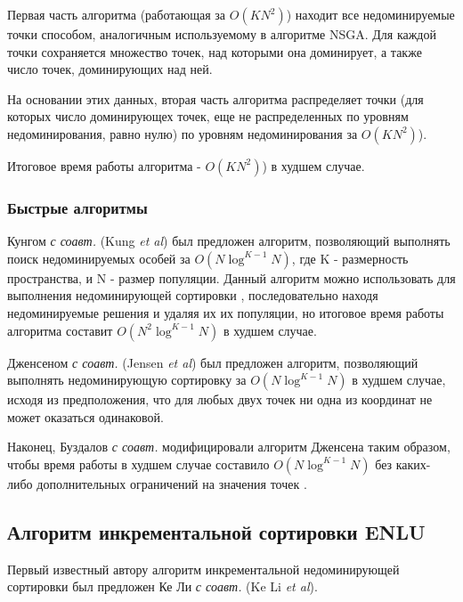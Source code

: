 Первая часть алгоритма (работающая за $O(KN^2)$) находит все недоминируемые точки способом,
аналогичным используемому в алгоритме NSGA. Для каждой точки сохраняется множество точек,
над которыми она доминирует, а также число точек, доминирующих над ней.

На основании этих данных, вторая часть алгоритма распределяет точки (для которых число
доминирующех точек, еще не распределенных по уровням недоминирования, равно нулю) по уровням
недоминирования за $O(KN^2)$).

Итоговое время работы алгоритма - $O(KN^2)$) в худшем случае.

\subsubsection{Быстрые алгоритмы}
Кунгом \textit{с соавт.} (Kung \textit{et al}) \cite{kung} был предложен алгоритм, позволяющий 
выполнять поиск недоминируемых особей за $O(N \log^{K - 1} N)$, где K - размерность пространства, 
и N - размер популяции. Данный алгоритм можно использовать для выполнения недоминирующей сортировки \cite{max_me_ss_nsga2}, 
последовательно находя недоминируемые решения и удаляя их их популяции, но итоговое время работы
алгоритма составит $O(N^2 \log^{K - 1} N)$ в худшем случае.

Дженсеном \textit{с соавт.} (Jensen \textit{et al}) \cite{jensen} был предложен алгоритм, позволяющий 
выполнять недоминирующую сортировку за $O(N \log^{K - 1} N)$ в худшем случае, исходя из предположения,
что для любых двух точек ни одна из координат не может оказаться одинаковой.

Наконец, Буздалов \textit{с соавт.} модифицировали алгоритм Дженсена таким образом, чтобы
время работы в худшем случае составило $O(N \log^{K - 1} N)$ без каких-либо дополнительных ограничений
на значения точек \cite{max_sort}.

\subsection{Алгоритм инкрементальной сортировки ENLU}
Первый известный автору алгоритм инкрементальной недоминирующей сортировки был предложен
Ке Ли \textit{с соавт.} (Ke Li \textit{et al}). \cite{enlu}

